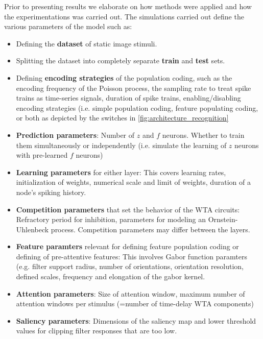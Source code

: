 \documentclass{report}
\begin{document}
Prior to presenting results we elaborate on how methods were applied and how the experimentations was carried out. The simulations carried out define the various parameters of the model such as:
\begin{itemize}
  \item Defining the \textbf{dataset} of static image stimuli.
  \item Splitting the dataset into completely separate \textbf{train} and \textbf{test} sets.
  \item Defining \textbf{encoding strategies} of the population coding, such as the encoding frequency of the Poisson process, the sampling rate to treat spike trains as time-series signals, duration of spike trains, enabling/disabling encoding strategies (i.e. simple population coding, feature populating coding, or both as depicted by the switches in \cref{fig:architecture_recognition} 
  \item \textbf{Prediction parameters}: Number of $z$ and $f$ neurons. Whether to train them simultaneously or independently (i.e. simulate the learning of $z$ neurons with pre-learned $f$ neurons)
  \item \textbf{Learning parameters} for either layer: This covers learning rates, initialization of weights, numerical scale and limit of weights, duration of a node's spiking history.
  \item \textbf{Competition parameters} that set the behavior of the WTA circuits: Refractory period for inhibition, parameters for modeling an Ornstein-Uhlenbeck process. Competition parameters may differ between the layers.
  \item \textbf{Feature paramters} relevant for defining feature population coding or defining of pre-attentive features: This involves Gabor function paramters (e.g. filter support radius, number of orientations, orientation resolution, defined scales, frequency and elongation of the gabor kernel.
  \item \textbf{Attention parameters}: Size of attention window, maximum number of attention windows per stimulus (=number of time-delay WTA components)
  \item \textbf{Saliency parameters}: Dimensions of the saliency map and lower threshold values for clipping filter responses that are too low.
\end{itemize}
  
\end{document}
